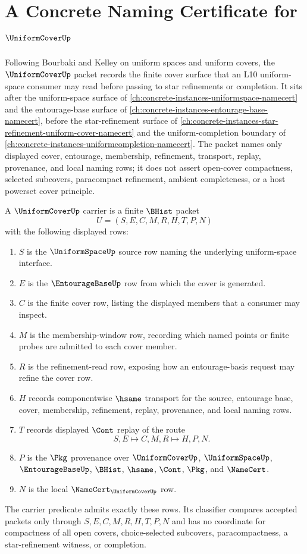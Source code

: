 \chapter{A Concrete Naming Certificate for $\UniformCoverUp$}
\label{ch:concrete-instances-uniform-cover-namecert}

Following Bourbaki and Kelley on uniform spaces and uniform covers, the $\UniformCoverUp$ packet records the finite cover surface that an L10 uniform-space consumer may read before passing to star refinements or completion. It sits after the uniform-space surface of \autoref{ch:concrete-instances-uniformspace-namecert} and the entourage-base surface of \autoref{ch:concrete-instances-entourage-base-namecert}, before the star-refinement surface of \autoref{ch:concrete-instances-star-refinement-uniform-cover-namecert} and the uniform-completion boundary of \autoref{ch:concrete-instances-uniformcompletion-namecert}. The packet names only displayed cover, entourage, membership, refinement, transport, replay, provenance, and local naming rows; it does not assert open-cover compactness, selected subcovers, paracompact refinement, ambient completeness, or a host powerset cover principle.

\begin{definition}
\label{def:uniform-cover-carrier}
A $\UniformCoverUp$ carrier is a finite $\BHist$ packet
$$
U=(S,E,C,M,R,H,T,P,N)
$$
with the following displayed rows:
\begin{enumerate}
\item $S$ is the $\UniformSpaceUp$ source row naming the underlying uniform-space interface.
\item $E$ is the $\EntourageBaseUp$ row from which the cover is generated.
\item $C$ is the finite cover row, listing the displayed members that a consumer may inspect.
\item $M$ is the membership-window row, recording which named points or finite probes are admitted to each cover member.
\item $R$ is the refinement-read row, exposing how an entourage-basis request may refine the cover row.
\item $H$ records componentwise $\hsame$ transport for the source, entourage base, cover, membership, refinement, replay, provenance, and local naming rows.
\item $T$ records displayed $\Cont$ replay of the route
$$
S,E \longmapsto C,M,R \longmapsto H,P,N .
$$
\item $P$ is the $\Pkg$ provenance over $\UniformCoverUp$, $\UniformSpaceUp$, $\EntourageBaseUp$, $\BHist$, $\hsame$, $\Cont$, $\Pkg$, and $\NameCert$.
\item $N$ is the local $\NameCert_{\UniformCoverUp}$ row.
\end{enumerate}
The carrier predicate admits exactly these rows. Its classifier compares accepted packets only through $S,E,C,M,R,H,T,P,N$ and has no coordinate for compactness of all open covers, choice-selected subcovers, paracompactness, a star-refinement witness, or completion.
\end{definition}

